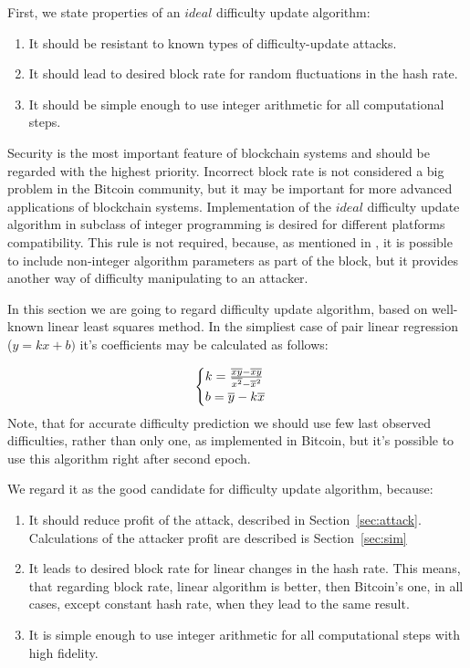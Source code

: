 \documentclass[number,preprint,review]{elsarticle}
\begin{document}
First, we state properties of an \(ideal\) difficulty update algorithm:
\begin{enumerate}
\item{It should be resistant to known types of difficulty-update attacks.}
\item{It should lead to desired block rate for random fluctuations in the hash rate.}
\item{It should be simple enough to use integer arithmetic for all computational steps.}
\end{enumerate}
Security is the most important feature of blockchain systems and should be regarded with the highest priority.
Incorrect block rate is not considered a big problem in the Bitcoin community, but it may be important for more advanced applications of blockchain systems.
Implementation of the \(ideal\) difficulty update algorithm in subclass of integer programming is desired for different platforms compatibility.
This rule is not required, because, as mentioned in \cite{kraft2015difficulty}, it is possible to include non-integer algorithm parameters as part of the block, but it provides another way of difficulty manipulating to an attacker.

In this section we are going to regard difficulty update algorithm, based on well-known linear least squares method\cite{lawson1974solving}.
In the simpliest case of pair linear regression (\(y=kx+b)\) it's coefficients may be calculated as follows:

\begin{equation}
  \begin{cases}
    k= {{\overline{xy} - \overline{x}\overline{y}} \over {\overline{x^2} - \overline{x}^2}}  \\
    b=\overline{y}-k\overline{x}
  \end{cases}
\end{equation}
Note, that for accurate difficulty prediction we should use few last observed difficulties, rather than only one, as implemented in Bitcoin, but it's possible to use this algorithm right after second epoch.


We regard it as the good candidate for difficulty update algorithm, because:
\begin{enumerate}
\item{It should reduce profit of the attack, described in Section~\ref{sec:attack}.
Calculations of the attacker profit are described is Section~\ref{sec:sim}}
\item{It leads to desired block rate for linear changes in the hash rate.
This means, that regarding block rate, linear algorithm is better, then Bitcoin's one, in all cases, except constant hash rate, when they lead to the same result. }
\item{It is simple enough to use integer arithmetic for all computational steps with high fidelity.}
\end{enumerate}
\end{document}

